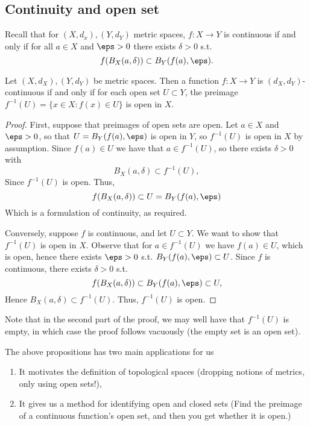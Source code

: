 \subsection{Continuity and open set}
Recall that for $(X,d_x),(Y,d_Y)$ metric spaces, $f:X\to Y$ is continuous if and
only if for all $a\in X$ and $\eps>0$ there exists $\delta>0$ s.t.
\[f(B_X(a,\delta))\subset B_Y(f(a),\eps).\]
\begin{proposition}
  Let $(X,d_X),(Y,d_Y)$ be metric spaces. Then a function $f:X\to Y$ is
  $(d_X,d_Y)$-continuous if and only if for each open set $U\subset Y$, the
  preimage $f^{-1}(U)=\{x\in X: f(x)\in U\}$ is open in $X$.
  \label{<+label+>}
\end{proposition}
\begin{proof}
  First, suppose that preimages of open sets are open. Let $a\in X$ and
  $\eps>0$, so that $U=B_Y(f(a),\eps)$ is open in $Y$, so $f^{-1}(U)$ is open in
  $X$ by assumption. Since $f(a)\in U$ we have that $a\in f^{-1}(U)$, so there
  exists $\delta>0$ with 
  \[B_X(a,\delta)\subset f^{-1}(U),\]
  Since $f^{-1}(U)$ is open. Thus,
  \[f(B_X(a,\delta)) \subset U=B_Y(f(a),\eps)\]
  Which is a formulation of continuity, as required.

  Conversely, suppose $f$ is continuous, and let $U\subset Y$. We want to show
  that $f^{-1}(U)$ is open in $X$. Observe that for $a\in f^{-1}(U)$ we have
  $f(a)\in U$, which is open, hence there exists $\eps>0$ s.t.
  $B_Y(f(a),\eps)\subset U$. Since $f$ is continuous, there exists $\delta>0$
  s.t. 
  \[f(B_X(a,\delta))\subset B_Y(f(a), \eps)\subset U,\]
  Hence $B_X(a,\delta)\subset f^{-1}(U)$. Thus, $f^{-1}(U)$ is open.
\end{proof}
\begin{remark}
  Note that in the second part of the proof, we may well have that $f^{-1}(U)$
  is empty, in which case the proof follows vacuously (the empty set is an open
  set).
\end{remark}
The above propositions has two main applications for us
\begin{enumerate}
  \item It motivates the definition of topological spaces (dropping notions of
    metrics, only using open sets!),
  \item It gives us a method for identifying open and closed sets (Find the
    preimage of a continuous function's open set, and then you get whether it is
  open.)
\end{enumerate}

